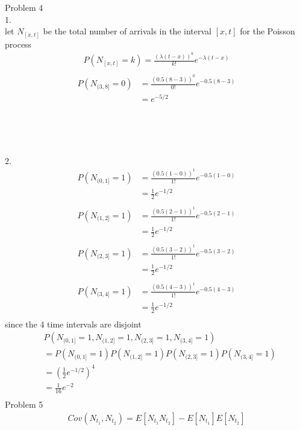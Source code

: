 \documentclass[12pt,border=4pt,multi]{article} %
\begin{document}
\newpage
\noindent
Problem 4\\
1.\\
let $N_{[x, t]}$ be the total number of arrivals in the interval $[x, t]$ for the Poisson process
\begin{align*}
P(N_{[x, t]} = k) = \frac{(\lambda (t - x))^k}{k!} e^{-\lambda (t - x)}\\
\end{align*}
\begin{align*}
P(N_{(3, 8]} = 0) &= \frac{(0.5(8 - 3))^0}{0!} e^{-0.5 (8 - 3)}\\
&= \boxed{e^{-5 / 2}}\\
\end{align*}
\\
\\
\\
\\
2.
\begin{align*}
P(N_{(0, 1]} = 1) &= \frac{(0.5(1 - 0))^1}{1!} e^{-0.5(1 - 0)}\\
&= \frac{1}{2}e^{-1 / 2}\\
\end{align*}
\begin{align*}
P(N_{(1, 2]} = 1) &= \frac{(0.5(2 - 1))^1}{1!} e^{-0.5(2 - 1)}\\
&= \frac{1}{2}e^{-1 / 2}\\
\end{align*}
\begin{align*}
P(N_{(2, 3]} = 1) &= \frac{(0.5(3 - 2))^1}{1!} e^{-0.5(3 - 2)}\\
&= \frac{1}{2}e^{-1 / 2}\\
\end{align*}
\begin{align*}
P(N_{(3, 4]} = 1) &= \frac{(0.5(4 - 3))^1}{1!} e^{-0.5(4 - 3)}\\
&= \frac{1}{2}e^{-1 / 2}\\
\end{align*}
since the 4 time intervals are disjoint 
\begin{align*}
&P(N_{(0, 1]} = 1, N_{(1, 2]} = 1, N_{(2, 3]} = 1, N_{(3, 4]} = 1)\\
&= P(N_{(0, 1]} = 1)P(N_{(1, 2]} = 1)P(N_{(2, 3]} = 1)P(N_{(3, 4]} = 1)\\
&= \boxed{\left(\frac{1}{2}e^{-1 / 2}\right)^4}\\
&= \boxed{\frac{1}{16}e^{-2}}\\
\end{align*}
\newpage
\noindent
Problem 5
\begin{align*}
Cov(N_{t_1}, N_{t_2}) = E[N_{t_1}N_{t_2}] - E[N_{t_1}]E[N_{t_2}]
\end{align*}
\end{document}
